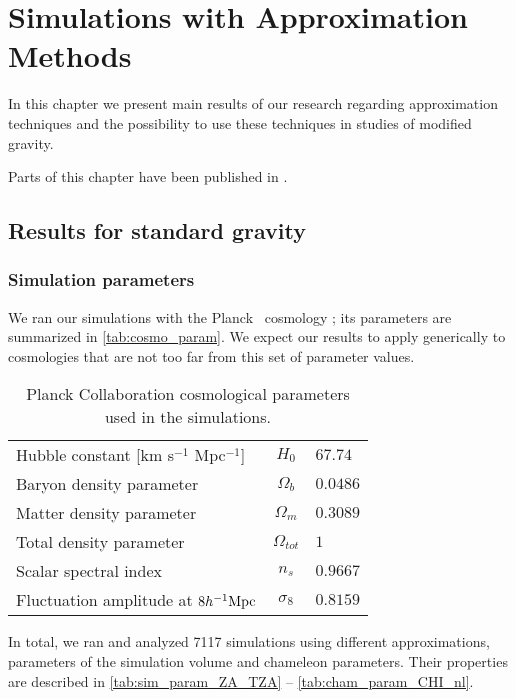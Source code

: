 \chapter{Simulations with Approximation Methods}
\label{chpt:app_sims}
In this chapter we present main results of our research regarding approximation techniques and the possibility to use these techniques in studies of modified gravity.

Parts of this chapter have been published in \textcite{2020MNRAS.493.2085V}.
\section{Results for standard gravity}

\subsection{Simulation parameters}
We ran our simulations with the Planck \LCDM\ cosmology \parencite{planck_cosm}; its parameters are summarized in \autoref{tab:cosmo_param}. We expect our results to apply generically to cosmologies that are not too far from this set of parameter values.
\begin{table}
\centering
\begin{tabular}{ l c l }
  \hline \hline
  Hubble constant  [km s$^{-1}$ Mpc$^{-1}$] & $H_0$ & $67.74$ \\
  Baryon density parameter & $\Omega_b$ & $0.0486$ \\
  Matter density parameter & $\Omega_m$ & $0.3089$ \\
  Total density parameter & $\Omega_{tot}$ & $1$ \\
  Scalar spectral index & $n_s$ & $0.9667$ \\
  Fluctuation amplitude at $8h^{-1}\text{Mpc}$ & $\sigma_8$ & $0.8159$ \\
  \hline \hline
\end{tabular}
\caption{Planck Collaboration cosmological parameters \parencite{planck_cosm} used in the simulations.}
\label{tab:cosmo_param}
\end{table}

In total, we ran and analyzed 7117 simulations using different approximations, parameters of the simulation volume and chameleon parameters. Their properties are described in \autoref{tab:sim_param_ZA_TZA} -- \autoref{tab:cham_param_CHI_nl}.

\begin{landscape}


\end{landscape}








